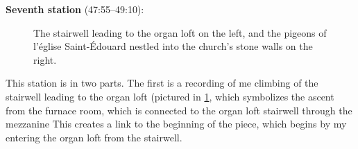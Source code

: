 \documentclass[12pt,twoside,maitrise]{dms_ks}
\theoremstyle{definition}
\begin{document}
{\textbf{Seventh station} (47:55--49:10):

\begin{figure}[h]
    \centering
    \caption{The stairwell leading to the organ loft on the left, and the pigeons of l'église Saint-Édouard nestled into the church's stone walls on the right.}
    \label{fig:station7}
\end{figure}

This station is in two parts. 
The first is a recording of me climbing of the stairwell leading to the organ loft (pictured in \cref{fig:station7}, which symbolizes the ascent from the furnace room, which is connected to the organ loft stairwell through the mezzanine
This creates a link to the beginning of the piece, which begins by my entering the organ loft from the stairwell. 

}
\end{document}
